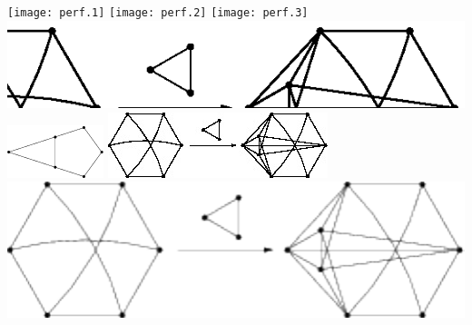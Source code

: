 \texttt{[image: perf.1]}
\texttt{[image: perf.2]}
\texttt{[image: perf.3]}
\includegraphics{perf.eps}
\includegraphics{perf.png}
\includegraphics{perf.jpg}
\includegraphics{perf.pdf}

